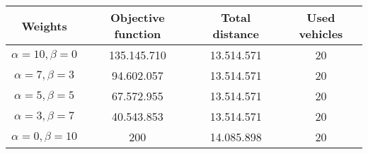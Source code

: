 {
\renewcommand{\arraystretch}{2}
\begin{longtable}[h]{| c | c | c | c |}
    \hline
    \textbf{Weights} & \textbf{Objective function} & \textbf{Total distance} & \textbf{Used vehicles} \\
    \hline
    \endhead
    $\alpha = 10, \beta = 0$ & 135.145.710 & 13.514.571 & 20 \\
    \hline
    $\alpha = 7, \beta = 3$  &  94.602.057 & 13.514.571 & 20 \\
    \hline
    $\alpha = 5, \beta = 5$  &  67.572.955 & 13.514.571 & 20 \\
    \hline
    $\alpha = 3, \beta = 7$  &  40.543.853 & 13.514.571 & 20 \\
    \hline
    $\alpha = 0, \beta = 10$ &         200 & 14.085.898 & 20 \\
    \hline
\end{longtable}
}